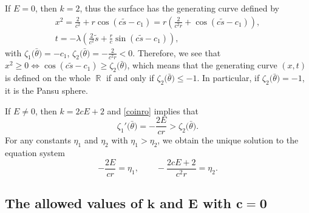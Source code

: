 \documentclass[pdftex]{sigma}
\numberwithin{equation}{section}
\DeclareMathOperator{\R}{\mathbb R}
\begin{document}
If $E=0$, then $k=2$, thus the surface has the generating curve defined by
\begin{gather*}
x^{2}=\frac{2}{c^2}+r\cos{(c\tilde{s}-c_1)}=r\left(\frac{2}{c^{2}r}+\cos{(c\tilde{s}-c_1)}\right),\\
t=-\lambda\left(\frac{2}{c^2}\tilde{s}+\frac{r}{c}\sin{(c\tilde{s}-c_1)}\right),
\end{gather*}
with
$\zeta_{1}\bigl(\bar \theta\bigr)=-c_{1}$, $ \zeta_{2}\bigl(\bar \theta\bigr)=-\frac{2}{c^{2}r}<0$.
Therefore, we see that
$x^{2}\geq 0\Leftrightarrow \cos{(c\tilde{s}-c_1)}\geq\zeta_{2}\bigl(\bar \theta\bigr)$,
which means that the generating curve $(x,t)$ is defined on the whole $\R$ if and only if $\zeta_{2}\bigl(\bar \theta\bigr)\leq-1$.
In particular, if $\zeta_{2}\bigl(\bar \theta\bigr)=-1$, it is the Pansu sphere.

If $E\neq 0$, then $k=2cE+2$ and
 \eqref{coinro} implies that
\begin{equation} \label{coinro1}
\zeta_{1}'\bigl(\bar \theta\bigr)=-\frac{2E}{cr}>\zeta_{2}\bigl(\bar \theta\bigr).
\end{equation}
For any constants $\eta_{1}$ and $\eta_{2}$ with $\eta_{1}>\eta_{2}$, we
obtain the unique solution to the equation system
\[
-\frac{2E}{c r}=\eta_{1},\qquad -\frac{2cE+2}{c^{2}r}=\eta_{2}.
\]

\subsection[The allowed values of k and E with c=0]{The allowed values of $\boldsymbol{ k}$ and $\boldsymbol{E}$ with $\boldsymbol{c=0}$}
\end{document}
